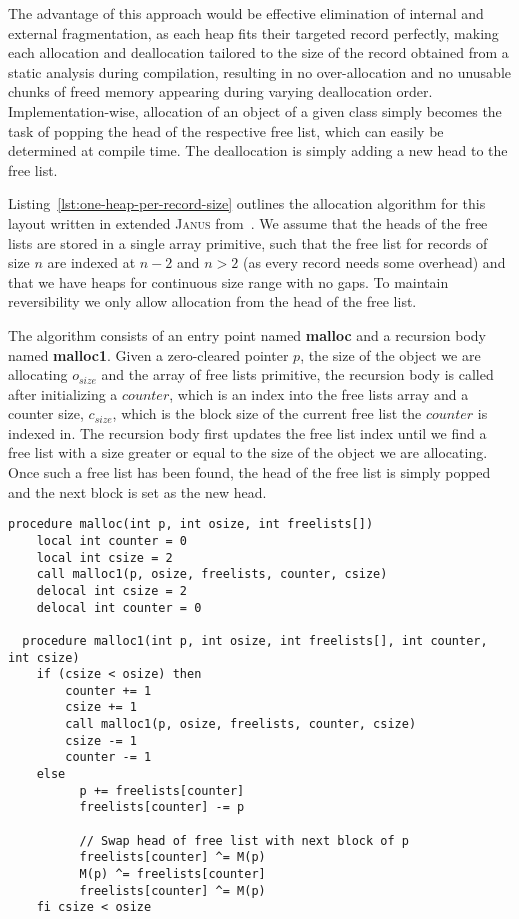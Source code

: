 The advantage of this approach would be effective elimination of internal and external fragmentation, as each heap fits their targeted record perfectly, making each allocation and deallocation tailored to the size of the record obtained from a static analysis during compilation, resulting in no over-allocation and no unusable chunks of freed memory appearing during varying deallocation order. Implementation-wise, allocation of an object of a given class simply becomes the task of popping the head of the respective free list, which can easily be determined at compile time. The deallocation is simply adding a new head to the free list.

Listing~\ref{lst:one-heap-per-record-size} outlines the allocation algorithm for this layout written in extended \textsc{Janus} from~\cite{ty:ejanus}. We assume that the heads of the free lists are stored in a single array primitive, such that the free list for records of size $n$ are indexed at $n-2$ and $n > 2$ (as every record needs some overhead) and that we have heaps for continuous size range with no gaps. To maintain reversibility we only allow allocation from the head of the free list.

The algorithm consists of an entry point named \textbf{malloc} and a recursion body named \textbf{malloc1}. Given a zero-cleared pointer $p$, the size of the object we are allocating $o_{size}$ and the array of free lists primitive, the recursion body is called after initializing a $counter$, which is an index into the free lists array and a counter size, $c_{size}$, which is the block size of the current free list the $counter$ is indexed in. The recursion body first updates the free list index until we find a free list with a size greater or equal to the size of the object we are allocating. Once such a free list has been found, the head of the free list is simply popped and the next block is set as the new head.\\

\begin{lstlisting}[caption={Allocation algorithm for one heap per record size implemented in extended Janus}, language=janus, style=basic, label={lst:one-heap-per-record-size}]
  procedure malloc(int p, int osize, int freelists[])
    local int counter = 0
    local int csize = 2
    call malloc1(p, osize, freelists, counter, csize)
    delocal int csize = 2
    delocal int counter = 0

  procedure malloc1(int p, int osize, int freelists[], int counter, int csize)
    if (csize < osize) then
        counter += 1
        csize += 1
        call malloc1(p, osize, freelists, counter, csize) 
        csize -= 1
        counter -= 1
    else
          p += freelists[counter]
          freelists[counter] -= p

          // Swap head of free list with next block of p 
          freelists[counter] ^= M(p)
          M(p) ^= freelists[counter]
          freelists[counter] ^= M(p)
    fi csize < osize   
\end{lstlisting}

